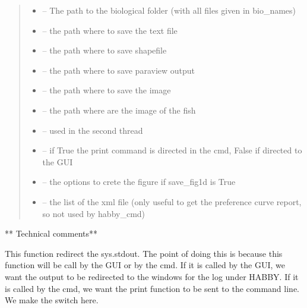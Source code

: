 \documentclass[letterpaper,10pt,english]{sphinxmanual}
\begin{document}
\begin{fulllineitems}
\begin{quote}
\begin{description}
\begin{itemize}
\item {} 
 -- The path to the biological folder (with all files given in bio\_names)

\item {} 
 -- the path where to save the text file

\item {} 
 -- the path where to save shapefile

\item {} 
 -- the path where to save paraview output

\item {} 
 -- the path where to save the image

\item {} 
 -- the path where are the image of the fish

\item {} 
 -- used in the second thread

\item {} 
 -- if True the print command is directed in the cmd, False if directed to the GUI

\item {} 
 -- the options to crete the figure if save\_fig1d is True

\item {} 
 -- the list of the xml file (only useful to get the preference curve report, so not used by habby\_cmd)

\end{itemize}

\end{description}\end{quote}

** Technical comments**

This function redirect the sys.stdout. The point of doing this is because this function will be call by the GUI or
by the cmd. If it is called by the GUI, we want the output to be redirected to the windows for the log under HABBY.
If it is called by the cmd, we want the print function to be sent to the command line. We make the switch here.

\end{fulllineitems}
\end{document}
